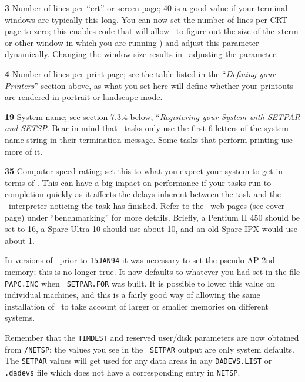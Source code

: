 \item{{\bf 3}} Number of lines per ``crt'' or screen page; 40 is a good
	value if your terminal windows are typically this long.  You can
	now set the number of lines per CRT page to zero; this enables
	code that will allow \AIPS\ to figure out the size of the xterm
	or other window in which you are running \ttaips) and adjust
	this parameter dynamically.  Changing the window size results in
	\ttaips\ adjusting the parameter.
\item{{\bf 4}} Number of lines per print page; see the table listed in
	the ``{\it Defining your Printers\/}'' section above, as what
	you set here will define whether your printouts are rendered in
	portrait or landscape mode.
\item{{\bf 19}} System name; see
	section 7.3.4 below, ``{\it Registering your System with SETPAR
	and SETSP\/}.  Bear in mind that \AIPS\ tasks only use the first
	6 letters of the system name string in their termination
	message.  Some tasks that perform printing use more of it.
\item{{\bf 35}} Computer speed rating; set this to what you expect your
	system to get in terms of .  This can have a
	big impact on performance if your tasks run to completion
	quickly as it affects the delays inherent between the task and
	the \ttaips\ interpreter noticing the task has finished.  Refer
	to the \AIPS\ web pages (see cover page) under ``benchmarking''
	for more details.  Briefly, a Pentium II 450 should be set to
	16, a Sparc Ultra 10 should use about 10, and an old Sparc IPX
	would use about 1.\medskip

\noindent In versions of \AIPS\ prior to {\tt 15JAN94} it was necessary
to set the pseudo-AP 2nd memory; this is no longer true.  It now
defaults to whatever you had set in the file {\tt PAPC.INC} when {\tt
SETPAR.FOR} was built.  It is possible to lower this value on individual
machines, and this is a fairly good way of allowing the same
installation of \AIPS\ to take account of larger or smaller memories on
different systems.

Remember that the {\tt TIMDEST} and reserved user/disk parameters are
now obtained from {\tt{}/NETSP}; the values you see in the {\tt
SETPAR} output are only system defaults.  The {\tt SETPAR} values will
get used for any data areas in any {\tt DADEVS.LIST} or {\tt .dadevs}
file which does not have a corresponding entry in {\tt NETSP}.


